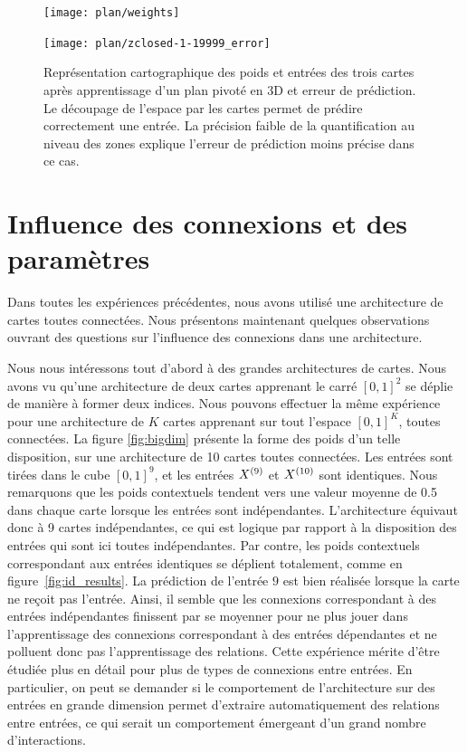 \documentclass[../main]{subfiles}
\begin{document}
\begin{figure}
	\begin{minipage}{0.48\textwidth}
	\centering\texttt{[image: plan/weights]}
	\end{minipage}
	\begin{minipage}{0.48\textwidth}
	\texttt{[image: plan/zclosed-1-19999\_error]}	
	\end{minipage}	
	\caption{Représentation cartographique des poids et entrées des trois cartes après apprentissage d'un plan pivoté en 3D et erreur de prédiction. 
	Le découpage de l'espace par les cartes permet de prédire correctement une entrée. La précision faible de la quantification au niveau des zones explique l'erreur de prédiction moins précise dans ce cas. \label{fig:plan3}}
	\end{figure}


\section{Influence des connexions et des paramètres}

Dans toutes les expériences précédentes, nous avons utilisé une architecture de cartes toutes connectées. Nous présentons maintenant quelques observations ouvrant des questions sur l'influence des connexions dans une architecture.

Nous nous intéressons tout d'abord à des grandes architectures de cartes. Nous avons vu qu'une architecture de deux cartes apprenant le carré $[0,1]^2$ se déplie de manière à former deux indices. Nous pouvons effectuer la même expérience pour une architecture de $K$ cartes apprenant sur tout l'espace $[0,1]^K$, toutes connectées.
La figure \ref{fig:bigdim} présente la forme des poids d'un telle disposition, sur une architecture de 10 cartes toutes connectées. Les entrées sont tirées dans le cube $[0,1]^9$, et les entrées $X^{({9})}$ et $X^{({10})}$ sont identiques.
Nous remarquons que les poids contextuels tendent vers une valeur moyenne de 0.5 dans chaque carte lorsque les entrées sont indépendantes. L'architecture équivaut donc à 9 cartes indépendantes, ce qui est logique par rapport à la disposition des entrées qui sont ici toutes indépendantes. Par contre, les poids contextuels correspondant aux entrées identiques se déplient totalement, comme en figure~\ref{fig:id_results}. La prédiction de l'entrée $9$ est bien réalisée lorsque la carte ne reçoit pas l'entrée. Ainsi, il semble que les connexions correspondant à des entrées indépendantes finissent par se moyenner pour ne plus jouer dans l'apprentissage des connexions correspondant à des entrées dépendantes et ne polluent donc pas l'apprentissage des relations.
Cette expérience mérite d'être étudiée plus en détail pour plus de types de connexions entre entrées. 
En particulier, on peut se demander si le comportement de l'architecture sur des entrées en grande dimension permet d'extraire automatiquement des relations entre entrées, ce qui serait un comportement émergeant d'un grand nombre d'interactions.
\end{document}

